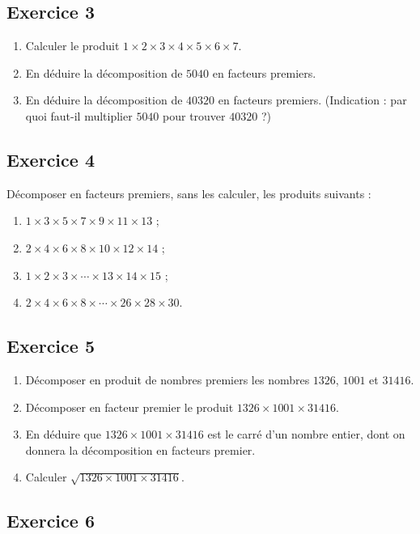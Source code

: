 \documentclass[12 pt]{article}
\theoremstyle{plain}
\newcounter{n}
\numberwithin{n}{section}
\begin{document}
\subsection*{Exercice 3}

\begin{enumerate}
\item Calculer le produit $1\times 2 \times 3 \times 4 \times 5 \times 6 \times 7$. 
\item En déduire la décomposition de $5 040$ en facteurs premiers. 
\item En déduire la décomposition de $40 320$ en facteurs premiers. (Indication : par quoi faut-il multiplier $5 040$ pour trouver $40 320$ ?)
\end{enumerate}

\subsection*{Exercice 4}
Décomposer en facteurs premiers, sans les calculer, les produits suivants : 
\begin{enumerate}
\item $1\times 3 \times 5 \times 7 \times 9 \times 11 \times 13$ ;
\item $2 \times 4 \times 6 \times 8 \times 10 \times 12 \times 14$ ; 
\item $ 1\times 2 \times 3 \times \cdots \times 13 \times 14 \times 15$ ; 
\item $2 \times 4 \times 6 \times 8 \times \cdots \times 26 \times 28 \times 30$. 
\end{enumerate}

\subsection*{Exercice 5}
\begin{enumerate}
\item Décomposer en produit de nombres premiers les nombres 
$1 326$, $1 001$ et $31 416$. 
\item Décomposer en facteur premier le produit $1 326\times 1 001
\times 31 416$. 
\item En déduire que $1 326\times 1 001
\times 31 416$ est le carré d'un nombre entier, dont on donnera la décomposition en facteurs premier. 
\item Calculer $\sqrt{1 326\times 1 001
\times 31 416}$. 
\end{enumerate}

\subsection*{Exercice 6}
\end{document}
